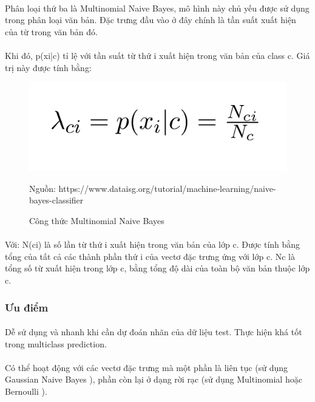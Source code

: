 \documentclass{article}
\begin{document}
\paragraph{}Phân loại thứ ba là Multinomial Naive Bayes, mô hình này chủ yếu được sử dụng trong phân loại văn bản. Đặc trưng đầu vào ở đây chính là tần suất xuất hiện của từ trong văn bản đó.
\paragraph{}Khi đó, p(xi|c) tỉ lệ với tần suất từ thứ i xuất hiện trong văn bản của class c. Giá trị này được tính bằng:
\begin{figure}[!h]
	\begin{center}
		\includegraphics[width=\linewidth]{images/Multinomial.png}
		\caption{\fontsize{14}{20}\selectfont Công thức Multinomial Naive Bayes}
		Nguồn: https://www.dataisg.org/tutorial/machine-learning/naive-bayes-classifier
	\end{center}
\end{figure}
\pagebreak{}
\paragraph{}Với: N(ci) là số lần từ thứ i xuất hiện trong văn bản của lớp c. Được tính bằng tổng của tất cả các thành phần thứ i của vectơ đặc trưng ứng với lớp c. Nc  là tổng số từ xuất hiện trong lớp c, bằng tổng độ dài của toàn bộ văn bản thuộc lớp c.
\subsubsection{Ưu điểm}
\paragraph{}Dễ sử dụng và nhanh khi cần dự đoán nhãn của dữ liệu test. Thực hiện khá tốt trong multiclass prediction.
\paragraph{}
Có thể hoạt động với các vectơ đặc trưng mà một phần là liên tục (sử dụng Gaussian Naive Bayes ), phần còn lại ở dạng rời rạc (sử dụng Multinomial hoặc Bernoulli ).
\end{document}
